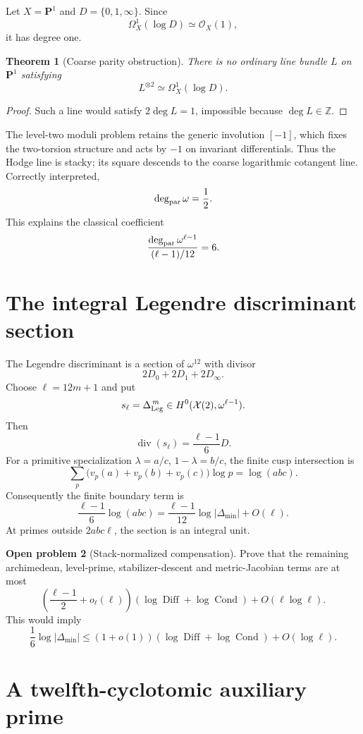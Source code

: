 \documentclass[11pt]{amsart}
\newtheorem{theorem}{Theorem}[section]
\theoremstyle{definition}
\newtheorem{problem}[theorem]{Open problem}
\theoremstyle{remark}
\newcommand{\Z}{\mathbb Z}
\begin{document}
Let $X=\mathbf P^1$ and $D=\{0,1,\infty\}$.  Since
\[
 \Omega_X^1(\log D)\simeq\mathcal O_X(1),
\]
it has degree one.

\begin{theorem}[Coarse parity obstruction]
There is no ordinary line bundle $L$ on $\mathbf P^1$ satisfying
\[
 L^{\otimes2}\simeq\Omega_X^1(\log D).
\]
\end{theorem}

\begin{proof}
Such a line would satisfy $2\deg L=1$, impossible because $\deg L\in\Z$.
\end{proof}

The level-two moduli problem retains the generic involution $[-1]$, which fixes the two-torsion structure and acts by $-1$ on invariant differentials.  Thus the Hodge line is stacky; its square descends to the coarse logarithmic cotangent line.  Correctly interpreted,
\[
 \deg_{\rm par}\omega=\frac12.
\]
This explains the classical coefficient
\[
 \frac{\deg_{\rm par}\omega^{\ell-1}}{(\ell-1)/12}=6.
\]

\section{The integral Legendre discriminant section}

The Legendre discriminant is a section of $\omega^{12}$ with divisor
\[
 2D_0+2D_1+2D_\infty.
\]
Choose $\ell=12m+1$ and put
\[
 s_\ell=\Delta_{\rm Leg}^{\,m}\in H^0(\mathcal X(2),\omega^{\ell-1}).
\]
Then
\[
 \operatorname{div}(s_\ell)=\frac{\ell-1}{6}D.
\]
For a primitive specialization $\lambda=a/c$, $1-\lambda=b/c$, the finite cusp intersection is
\[
 \sum_p\bigl(v_p(a)+v_p(b)+v_p(c)\bigr)\log p=\log(abc).
\]
Consequently the finite boundary term is
\[
 \frac{\ell-1}{6}\log(abc)
 =\frac{\ell-1}{12}\log|\Delta_{\min}|+O(\ell).
\]
At primes outside $2abc\ell$, the section is an integral unit.

\begin{problem}[Stack-normalized compensation]
Prove that the remaining archimedean, level-prime, stabilizer-descent and metric-Jacobian terms are at most
\[
 \left(\frac{\ell-1}{2}+o_\ell(\ell)\right)
 (\log\operatorname{Diff}+\log\operatorname{Cond})
 +O(\ell\log\ell).
\]
This would imply
\[
 \frac16\log|\Delta_{\min}|
 \le(1+o(1))(\log\operatorname{Diff}+\log\operatorname{Cond})
 +O(\log\ell).
\]
\end{problem}

\section{A twelfth-cyclotomic auxiliary prime}
\end{document}
